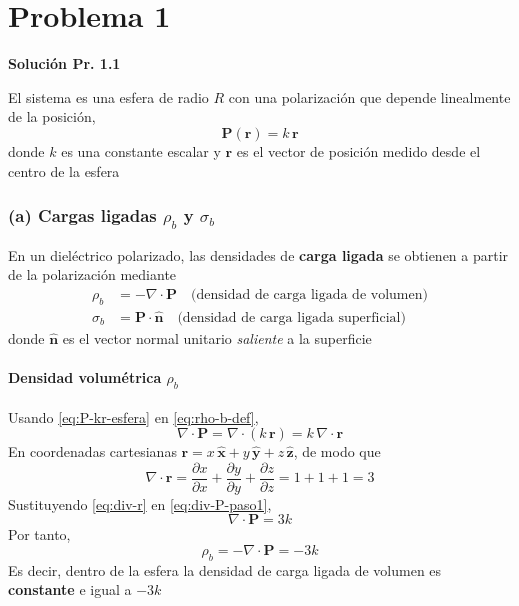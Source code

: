\documentclass{article}
\begin{document}
\section{Problema 1}

\textcolor{Cinnabar}{\textbf{Solución Pr. 1.1}} \vspace{0.4cm}

El sistema es una esfera de radio $R$ con una polarización que depende linealmente de la posición,
\begin{equation}
\mathbf{P}(\mathbf{r}) = k\,\mathbf{r}
\label{eq:P-kr-esfera}
\end{equation}
donde $k$ es una constante escalar y $\mathbf{r}$ es el vector de posición medido desde el centro de la esfera

\subsubsection*{(a) Cargas ligadas $\rho_{b}$ y $\sigma_{b}$}

En un dieléctrico polarizado, las densidades de \textbf{carga ligada} se obtienen a partir de la polarización mediante
\begin{align}
\rho_{b} &= - \nabla \cdot \mathbf{P}
\quad \text{(densidad de carga ligada de volumen)} 
\label{eq:rho-b-def} \\
\sigma_{b} &= \mathbf{P}\cdot \hat{\mathbf{n}}
\quad \text{(densidad de carga ligada superficial)}
\label{eq:sigma-b-def}
\end{align}
donde $\hat{\mathbf{n}}$ es el vector normal unitario \emph{saliente} a la superficie


\paragraph{Densidad volumétrica $\rho_{b}$}

Usando \eqref{eq:P-kr-esfera} en \eqref{eq:rho-b-def},
\begin{equation}
\nabla \cdot \mathbf{P} = \nabla \cdot (k\,\mathbf{r}) = k\,\nabla \cdot \mathbf{r}
\label{eq:div-P-paso1}
\end{equation}
En coordenadas cartesianas $\mathbf{r} = x\,\hat{\mathbf{x}} + y\,\hat{\mathbf{y}} + z\,\hat{\mathbf{z}}$, de modo que
\begin{equation}
\nabla \cdot \mathbf{r} = 
\frac{\partial x}{\partial x} +
\frac{\partial y}{\partial y} +
\frac{\partial z}{\partial z} = 1 + 1 + 1 = 3
\label{eq:div-r}
\end{equation}
Sustituyendo \eqref{eq:div-r} en \eqref{eq:div-P-paso1},
\begin{equation}
\nabla \cdot \mathbf{P} = 3k
\label{eq:div-P-final}
\end{equation}
Por tanto,
\begin{equation}
\rho_{b} = - \nabla \cdot \mathbf{P} = -3k
\label{eq:rho-b-final}
\end{equation}
Es decir, dentro de la esfera la densidad de carga ligada de volumen es \textbf{constante} e igual a $-3k$
\end{document}
